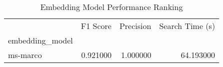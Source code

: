 \begin{table}
\caption{Embedding Model Performance Ranking}
\label{tab:embedding_ranking}
\begin{tabular}{lrrr}
\toprule
 & F1 Score & Precision & Search Time (s) \\
embedding_model &  &  &  \\
\midrule
ms-marco & 0.921000 & 1.000000 & 64.193000 \\
\bottomrule
\end{tabular}
\end{table}
